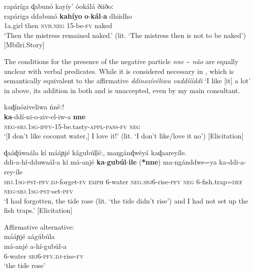 \documentclass[output=paper,colorlinks=true, citecolor=brown,draftmode]{langscibook}
\begin{document}
\ea\label{ex:cuw:89} rapáríga ɖabunó kayíy’ óokálá ðiiðoː \\ 
    \gll  rapáriga ddabunó \textbf{kahíyo} \textbf{o}{}-\textbf{kál}{}-\textbf{a} dhiidho \\
           1a.girl\textsc{} then \textsc{nvb.neg} \textsc{15-}be-\textsc{fv} naked \\
    \glt  ‘Then the mistress remained naked.’ (lit. ‘The mistress then is not to be naked’) [Mbílri.Story]
\z 

The conditions for the presence of the negative particle \textit{nne} {\textasciitilde} \textit{não} are equally unclear with verbal predicates. While it is considered necessary in , which is semantically equivalent to the affirmative \textit{ddinozívéliwa vaddíííddi} ‘I like [it] a lot’ in  above, its addition in both  and  is unaccepted, even by my main consultant. 

\ea\label{ex:cuw:90} kaɖínóziveliwa ńněː!\\
    \gll \textbf{ka}{}-ddí-ni-o-ziv-el-iw-a \textbf{nne}  \\
           \textsc{neg-sbj.1sg-ipfv-15}{}-be.tasty-\textsc{appl}{}-\textsc{pass-fv} \textsc{neg} \\
    \glt  ‘[I don’t like coconut water,] I love it!’ (lit. ‘I don't like/love it no’) [Elicitation]
\z 

\ea\label{ex:cuw:91}
    \ea\label{ex:cuw:91a} ɖaáɖúwaála kí mááɲjé kâgubúl̩léː, maŋgánɖwéyá kaɖaareyíle. \\ 
        \gll  ddi-a-hí-dduwaál-a kí má-anjé \textbf{ka}{}-\textbf{gubúl}{}-\textbf{ile} (\textbf{*nne}) ma-ngánddwe=ya ka-ddi-a-rey-íle \\
               \textsc{sbj.1sg-pst-pfv.dj}{}-forget-\textsc{fv} \textsc{emph} 6-water \textsc{neg.sbj6-}rise-\textsc{pfv} \textsc{neg} 6-fish.trap=\textsc{def} \textsc{neg-sbj.1sg-pst}{}-set-\textsc{pfv} \\
        \glt  ‘I had forgotten, the tide rose (lit. ‘the tide didn't rise') and I had not set up the fish traps.’ [Elicitation]

    \ex\label{ex:cuw:91b} Affirmative alternative: \\
            mááɲjé aágúbúla\\
        \gll má-anjé a-hí-gubúl-a \\
             6-water \textsc{sbj6-pfv.dj}{}-rise-\textsc{fv} \\
        \glt ‘the tide rose' 
    \z
\z 
\end{document}
